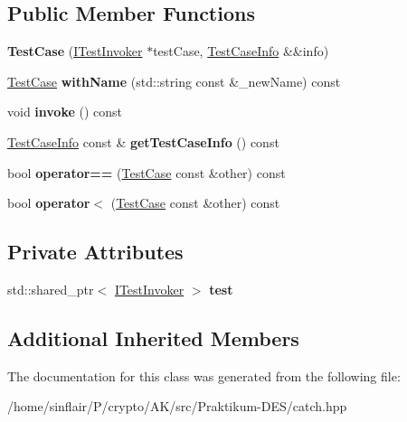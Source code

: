 \subsection*{Public Member Functions}
\begin{DoxyCompactItemize}
\item 
\mbox{\label{classCatch_1_1TestCase_aae5709fc1cb68e19ab0ac27e1ffd6a76}} 
{\bfseries Test\+Case} (\hyperlink{structCatch_1_1ITestInvoker}{I\+Test\+Invoker} $\ast$test\+Case, \hyperlink{structCatch_1_1TestCaseInfo}{Test\+Case\+Info} \&\&info)
\item 
\mbox{\label{classCatch_1_1TestCase_a0812e8a216d09b087d5874687009f0d6}} 
\hyperlink{classCatch_1_1TestCase}{Test\+Case} {\bfseries with\+Name} (std\+::string const \&\+\_\+new\+Name) const
\item 
\mbox{\label{classCatch_1_1TestCase_a26f346c8446dded0562fe3818ae71651}} 
void {\bfseries invoke} () const
\item 
\mbox{\label{classCatch_1_1TestCase_a1ea0d79f49156cebea076fe1ba50d2b6}} 
\hyperlink{structCatch_1_1TestCaseInfo}{Test\+Case\+Info} const  \& {\bfseries get\+Test\+Case\+Info} () const
\item 
\mbox{\label{classCatch_1_1TestCase_a5456d03a90f75292835c158f3a3374a1}} 
bool {\bfseries operator==} (\hyperlink{classCatch_1_1TestCase}{Test\+Case} const \&other) const
\item 
\mbox{\label{classCatch_1_1TestCase_a030e4b9282e9b32e08c8bd5e5cd6fa98}} 
bool {\bfseries operator$<$} (\hyperlink{classCatch_1_1TestCase}{Test\+Case} const \&other) const
\end{DoxyCompactItemize}
\subsection*{Private Attributes}
\begin{DoxyCompactItemize}
\item 
\mbox{\label{classCatch_1_1TestCase_a7aaa375d6f2bda735095eaa43395b54b}} 
std\+::shared\+\_\+ptr$<$ \hyperlink{structCatch_1_1ITestInvoker}{I\+Test\+Invoker} $>$ {\bfseries test}
\end{DoxyCompactItemize}
\subsection*{Additional Inherited Members}


The documentation for this class was generated from the following file\+:\begin{DoxyCompactItemize}
\item 
/home/sinflair/\+P/crypto/\+A\+K/src/\+Praktikum-\/\+D\+E\+S/catch.\+hpp\end{DoxyCompactItemize}
